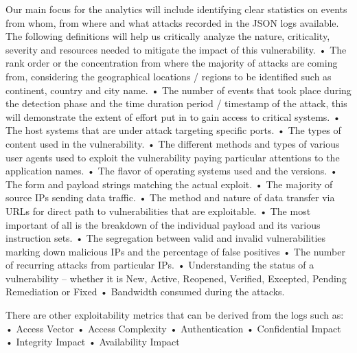 Our main focus for the analytics will include identifying clear statistics on events from whom, from where and what attacks recorded in the JSON logs available. The following definitions will help us critically analyze the nature, criticality, severity and resources needed to mitigate the impact of this vulnerability.
•	The rank order or the concentration from where the majority of attacks are coming from, considering the geographical locations / regions to be identified such as continent, country and city name. %
•	The number of events that took place during the detection phase and the time duration period / timestamp of the attack, this will demonstrate the extent of effort put in to gain access to critical systems. %
•	The host systems that are under attack targeting specific ports.%
•	The types of content used in the vulnerability. %
•	The different methods and types of various user agents used to exploit the vulnerability paying particular attentions to the application names.%
•	The flavor of operating systems used and the versions. %
•	The form and payload strings matching the actual exploit. %
•	The majority of source IPs sending data traffic. %
•	The method and nature of data transfer via URLs for direct path to vulnerabilities that are exploitable. %
•	The most important of all is the breakdown of the individual payload and its various instruction sets. %
•	The segregation between valid and invalid vulnerabilities marking down malicious IPs and the percentage of false positives %
•	The number of recurring attacks from particular IPs. %
•	Understanding the status of a vulnerability – whether it is New, Active, Reopened, Verified, Excepted, Pending Remediation or Fixed %
•	Bandwidth consumed during the attacks.  %

There are other exploitability metrics that can be derived from the logs such as:
•	Access Vector %
•	Access Complexity %
•	Authentication %
•	Confidential Impact %
•	Integrity Impact %
•	Availability Impact

